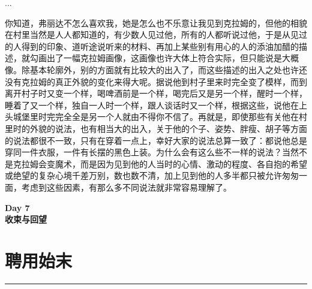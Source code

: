 \documentclass[12pt,a4paper]{article}
\begin{document}
...



你知道，弗丽达不怎么喜欢我，她是怎么也不乐意让我见到克拉姆的，但他的相貌在村里当然是人人都知道的，有少数人见过他，所有的人都听说过他，于是从见过的人得到的印象、道听途说听来的材料、再加上某些别有用心的人的添油加醋的描述，就勾画出了一幅克拉姆画像，这画像也许大体上符合实际，但只能说是大概像。除基本轮廓外，别的方面就有比较大的出入了，而这些描述的出入之处也许还没有克拉姆的真正外貌的变化来得大呢。据说他到村子里来时完全变了模样，而到离开村子时又变一个样，喝啤酒前是一个样，喝完后又是另一个样，醒时一个样，睡着了又一个样，独自一人时一个样，跟人谈话时又一个样，根据这些，说他在上头城堡里时完完全全是另一个人就由不得你不信了。再就是，即使那些有关他在村里时的外貌的说法，也有相当大的出入，关于他的个子、姿势、胖瘦、胡子等方面的说法都很不一致，只有在穿着一点上，幸好大家的说法总算一致了：都说他总是穿同一件衣服，一件有长摆的黑色上装。为什么会有这么些不一样的说法？当然不是克拉姆会变魔术，而是因为见到他的人当时的心情、激动的程度、各自抱的希望或绝望的复杂心境千差万别，数也数不清，加上见到他的人多半都只被允许匆匆一面，考虑到这些因素，有那么多不同说法就非常容易理解了。
\par{}
\newpage
\begin{center}
{\LARGE \bfseries Day 7\\[1em]收束与回望}
\end{center}
\vspace{3em}
\section{聘用始末}
\vspace{0.5em}
\vspace{0.3em}

\noindent\rule{\textwidth}{0.4pt}

\vspace{0.3em}
\end{document}
